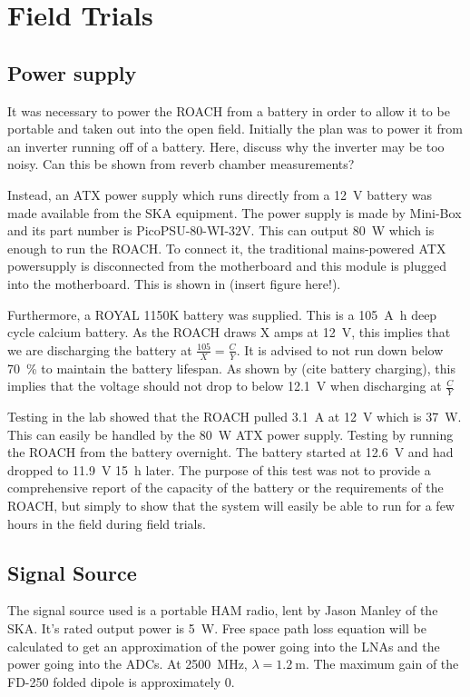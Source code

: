 \chapter{Field Trials}

\section{Power supply}
It was necessary to power the ROACH from a battery in order to allow it to be portable and taken out into the open field.
Initially the plan was to power it from an inverter running off of a battery. Here, discuss why the inverter may be too noisy. Can this be shown from reverb chamber measurements?

Instead, an ATX power supply which runs directly from a \SI{12}{\volt} battery was made available from the SKA equipment. The power supply is made by Mini-Box and its part number is PicoPSU-80-WI-32V. This can output \SI{80}{\watt} which is enough to run the ROACH. To connect it, the traditional mains-powered ATX powersupply is disconnected from the motherboard and this module is plugged into the motherboard. This is shown in (insert figure here!).

Furthermore, a ROYAL 1150K battery was supplied. This is a \SI{105}{\ampere\hour} deep cycle calcium battery.
As the ROACH draws X amps at \SI{12}{\volt}, this implies that we are discharging the battery at \(\frac{105}{X} = \frac{C}{Y}\).
It is advised to not run down below \SI{70}{\percent} to maintain the battery lifespan. As shown by (cite battery charging), this implies that the voltage should not drop to below \SI{12.1}{\volt} when discharging at \(\frac{C}{Y}\)

Testing in the lab showed that the ROACH pulled \SI{3.1}{\ampere} at \SI{12}{\volt} which is \SI{37}{\watt}. This can easily be handled by the \SI{80}{\watt} ATX power supply. 
Testing by running the ROACH from the battery overnight. The battery started at \SI{12.6}{\volt} and had dropped to \SI{11.9}{\volt} \SI{15}{\hour} later. The purpose of this test was not to provide a comprehensive report of the capacity of the battery or the requirements of the ROACH, but simply to show that the system will easily be able to run for a few hours in the field during field trials.

\section{Signal Source}
The signal source used is a portable HAM radio, lent by Jason Manley of the SKA. 
It's rated output power is \SI{5}{\watt}. Free space path loss equation will be calculated to get an approximation of the power going into the LNAs and the power going into the ADCs. At \SI{2500}{\mega\hertz}, \(\lambda = \SI{1.2}{\meter}\). The maximum gain of the FD-250 folded dipole is approximately \SI{0}{\dBi}.

